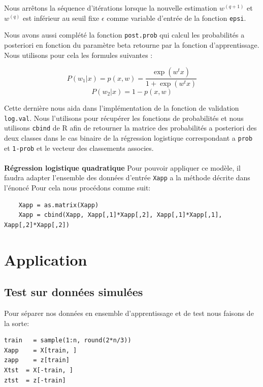 \documentclass[10pt]{article}
\begin{document}
	Nous arrêtons la séquence d'itérations lorsque la nouvelle estimation $w^{(q+1)}$ et $w^{(q)}$ est inférieur au seuil fixe $\epsilon$ comme variable d'entrée de la fonction \texttt{epsi}. 
	
	Nous avons aussi complété la fonction \texttt{post.prob} qui calcul les probabilités a posteriori en fonction du paramètre beta retourne par la fonction d'apprentissage. Nous utilisons pour cela les formules suivantes : 
	
	\begin{equation*}
	P(w_{1}|x) = p(x,w) = \dfrac{\exp(w^{t}x)}{1+\exp(w^{t}x)}
	\end{equation*}
	\begin{equation*}
	P(w_{2}|x) = 1-p(x,w)
	\end{equation*}
	
	Cette dernière nous aida dans l'implémentation de la fonction de validation \texttt{log.val}. Nous l'utilisons pour récupérer les fonctions de probabilités et nous utilisons \texttt{cbind} de R afin de retourner la matrice des probabilités a posteriori des deux classes dans le cas binaire de la régression logistique correspondant a \texttt{prob} et \texttt{1-prob} et le vecteur des classements associes.
	\\
	\\
	\textbf{Régression logistique quadratique}
	 Pour pouvoir appliquer ce modèle, il faudra adapter l'ensemble des données d'entrée \texttt{Xapp} a la méthode décrite dans l'énoncé Pour cela nous procédons comme suit: 
	\begin{lstlisting}
	Xapp = as.matrix(Xapp)
	Xapp = cbind(Xapp, Xapp[,1]*Xapp[,2], Xapp[,1]*Xapp[,1], Xapp[,2]*Xapp[,2])
	\end{lstlisting}
	
\section{Application}
\subsection{Test sur données simulées}
Pour séparer nos données en ensemble d'apprentissage et de test nous faisons de la sorte:
\begin{lstlisting}
train   = sample(1:n, round(2*n/3)) 
Xapp    = X[train, ]
zapp    = z[train]
Xtst  = X[-train, ]
ztst  = z[-train]
\end{lstlisting}
\end{document}
